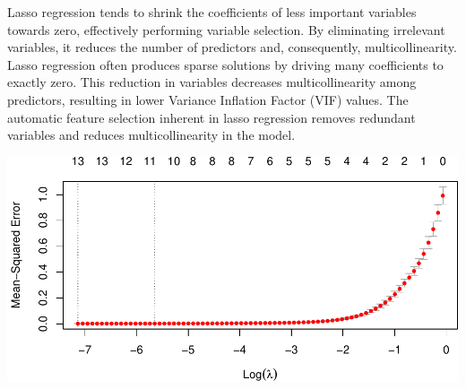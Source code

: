 \documentclass[
]{article}
\newenvironment{Shaded}{\begin{snugshade}}{\end{snugshade}}
\newcommand{\AttributeTok}[1]{\textcolor[rgb]{0.13,0.29,0.53}{#1}}
\newcommand{\CommentTok}[1]{\textcolor[rgb]{0.56,0.35,0.01}{\textit{#1}}}
\newcommand{\ConstantTok}[1]{\textcolor[rgb]{0.56,0.35,0.01}{#1}}
\newcommand{\DecValTok}[1]{\textcolor[rgb]{0.00,0.00,0.81}{#1}}
\newcommand{\FunctionTok}[1]{\textcolor[rgb]{0.13,0.29,0.53}{\textbf{#1}}}
\newcommand{\NormalTok}[1]{#1}
\newcommand{\OtherTok}[1]{\textcolor[rgb]{0.56,0.35,0.01}{#1}}
\newcommand{\SpecialCharTok}[1]{\textcolor[rgb]{0.81,0.36,0.00}{\textbf{#1}}}
\newcommand{\StringTok}[1]{\textcolor[rgb]{0.31,0.60,0.02}{#1}}
\begin{document}
Lasso regression tends to shrink the coefficients of less important
variables towards zero, effectively performing variable selection. By
eliminating irrelevant variables, it reduces the number of predictors
and, consequently, multicollinearity. Lasso regression often produces
sparse solutions by driving many coefficients to exactly zero. This
reduction in variables decreases multicollinearity among predictors,
resulting in lower Variance Inflation Factor (VIF) values. The automatic
feature selection inherent in lasso regression removes redundant
variables and reduces multicollinearity in the model.

\begin{Shaded}
\end{Shaded}

\begin{center}\includegraphics{Statistical_Learning_Final_Report_files/figure-latex/lasso_regression-1} \end{center}
\end{document}
